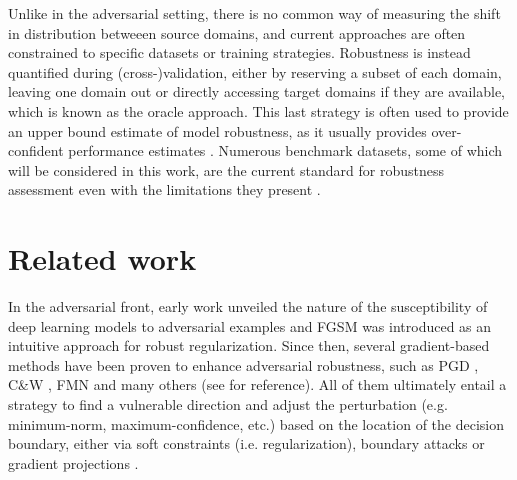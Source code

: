 Unlike in the adversarial setting, there is no common way of measuring
the shift in distribution betweeen source domains, and current approaches
are often constrained to specific datasets or training strategies. 
Robustness is instead quantified during (cross-)validation, either by reserving
a subset of each domain, leaving one domain out or
directly accessing target domains if they are available, 
which is known as the oracle approach. This last strategy is often
used to provide an upper bound estimate of model robustness, 
as it usually provides over-confident performance estimates
\cite{zhouDomainGeneralizationSurvey2022}.
Numerous benchmark datasets, some of which will be considered in this work, are the current 
standard for robustness assessment even with
the limitations they present
\cite{kohWILDSBenchmarkIntheWild2021}. 
\\


\section{Related work}

In the adversarial front, early work 
\cite{szegedyIntriguingPropertiesNeural2014}
unveiled the nature of the susceptibility of deep learning 
models to adversarial examples and FGSM 
\cite{goodfellowExplainingHarnessingAdversarial2015}
was introduced as an intuitive
approach for robust regularization. 
Since then, several gradient-based methods have been
proven to enhance adversarial robustness, such as PGD
\cite{madryDeepLearningModels2019}, C\&W 
\cite{carliniEvaluatingRobustnessNeural2017},
FMN
\cite{pintorFastMinimumnormAdversarial2021} and
many others (see 
\cite{liReviewAdversarialAttack2022} for reference). 
All of them ultimately entail a strategy to find
a vulnerable direction and adjust the perturbation 
(e.g. minimum-norm, maximum-confidence, etc.)
based on the location of the decision boundary, either via soft
constraints (i.e. regularization), boundary attacks or gradient
projections
\cite{baiRecentAdvancesAdversarial2021}. \\

